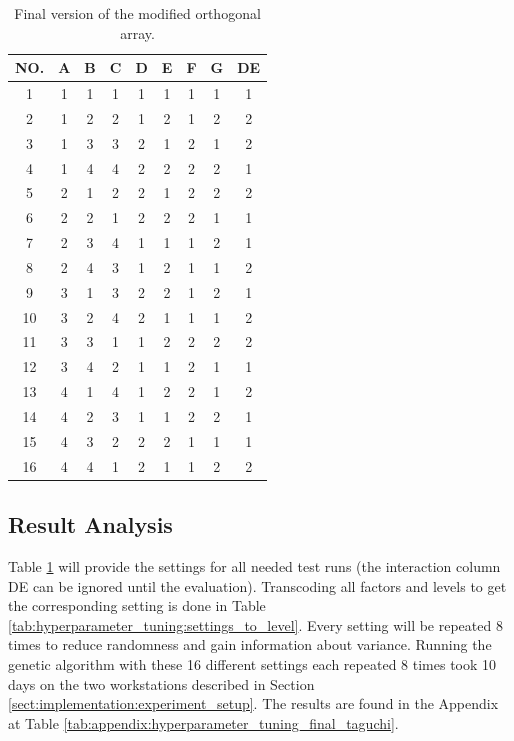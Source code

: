 \begin{table}[ht]
	\centering
	\begin{tabular}{ |c||c|c|c|c|c|c|c|c|  }
		\hline
		NO.& A & B & C & D & E & F & G & DE\\
		\hline
		1  & 1 & 1 & 1 & 1 & 1 & 1 & 1 & 1\\
		2  & 1 & 2 & 2 & 1 & 2 & 1 & 2 & 2\\
		3  & 1 & 3 & 3 & 2 & 1 & 2 & 1 & 2\\
		4  & 1 & 4 & 4 & 2 & 2 & 2 & 2 & 1\\
		5  & 2 & 1 & 2 & 2 & 1 & 2 & 2 & 2\\
		6  & 2 & 2 & 1 & 2 & 2 & 2 & 1 & 1\\
		7  & 2 & 3 & 4 & 1 & 1 & 1 & 2 & 1\\
		8  & 2 & 4 & 3 & 1 & 2 & 1 & 1 & 2\\
		9  & 3 & 1 & 3 & 2 & 2 & 1 & 2 & 1\\
		10 & 3 & 2 & 4 & 2 & 1 & 1 & 1 & 2\\
		11 & 3 & 3 & 1 & 1 & 2 & 2 & 2 & 2\\
		12 & 3 & 4 & 2 & 1 & 1 & 2 & 1 & 1\\
		13 & 4 & 1 & 4 & 1 & 2 & 2 & 1 & 2\\
		14 & 4 & 2 & 3 & 1 & 1 & 2 & 2 & 1\\
		15 & 4 & 3 & 2 & 2 & 2 & 1 & 1 & 1\\
		16 & 4 & 4 & 1 & 2 & 1 & 1 & 2 & 2\\
		\hline
	\end{tabular}
	\caption{Final version of the modified orthogonal array.}
	\label{tab:hyperparameter_tuning:final_taguchi}
\end{table}


\subsection{Result Analysis}
\label{sect:hyperparameter_tuning:analysis_of_results}
Table \ref{tab:hyperparameter_tuning:final_taguchi} will provide the settings for all needed test runs (the interaction column DE can be ignored until the evaluation). Transcoding all factors and levels to get the corresponding setting is done in Table \ref{tab:hyperparameter_tuning:settings_to_level}. Every setting will be repeated 8 times to reduce randomness and gain information about variance. Running the genetic algorithm with these 16 different settings each repeated 8 times took 10 days on the two workstations described in Section \ref{sect:implementation:experiment_setup}. The results are found in the Appendix at Table \ref{tab:appendix:hyperparameter_tuning_final_taguchi}.

